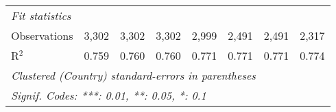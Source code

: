\begin{tabular}{lccccccc}
   \midrule \emph{Fit statistics}\\
   Observations                                                             & 3,302         & 3,302         & 3,302         & 2,999         & 2,491         & 2,491         & 2,317\\  
   R$^2$                                                                    & 0.759         & 0.760         & 0.760         & 0.771         & 0.771         & 0.771         & 0.774\\  
   \midrule
   \multicolumn{8}{l}{\emph{Clustered (Country) standard-errors in parentheses}}\\
   \multicolumn{8}{l}{\emph{Signif. Codes: ***: 0.01, **: 0.05, *: 0.1}}\\
\end{tabular}
\par\endgroup


